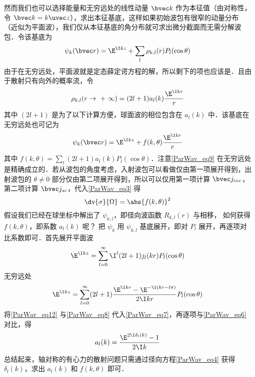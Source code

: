 然而我们也可以选择能量和无穷远处的线性动量 $\bvec k$ 作为本征值（由对称性，令 $\bvec k=k\uvec z$），求出本征基底，这样如果初始波包有很窄的动量分布（近似为平面波），我们仅从本征基底的角分布就可求出微分截面而无需分解波包．令该基底为
\begin{equation}\label{ParWav_eq7}
\psi_k(\bvec r) = \E^{\I kz} + \sum_l \rho_{k,l}(r) P_l(\cos \theta)
\end{equation}
由于在无穷远处，平面波就是定态薛定谔方程的解，所以剩下的项也应该是．且由于散射只有向外的概率流，令
\begin{equation}\label{ParWav_eq8}
{\rho_{k,l}}(r \to {\text{ + }}\infty ) = (2l + 1){a_l}(k)\frac{\E^{\I kr}}{r}
\end{equation}
其中 $(2l + 1)$ 是为了以下计算方便，球面波的相位包含在 ${a_l}(k)$ 中．该基底在无穷远处也可记为
\begin{equation}\label{ParWav_eq9}
\psi_k(\bvec r) = \E^{\I kz} + f(k,\theta )\frac{\E^{\I kr}}{r}
\end{equation}
其中 $f(k,\theta) = \sum_l (2l + 1) a_l(k) P_l(\cos \theta)$．注意\autoref{ParWav_eq9} 在无穷远处是精确成立的．若从波包的角度考虑，入射波包可以看做仅由第一项展开得到，出射波包的 $\theta  \ne 0$ 部分仅由第二项展开得到，所以可以仅用第一项计算 $\bvec j_{inc}$， 第二项计算 $\bvec j_{sc}$，代入\autoref{ParWav_eq3} 得
\begin{equation}
\dv{\sigma }{\Omega} = \abs{f(k,\theta)}^2
\end{equation}
假设我们已经在球坐标中解出了 $\psi_{k,l}$，即径向波函数 $R_{k,l}(r)$ 与相移， 如何获得 $f(k,\theta )$，即系数 $a_l(k)$ 呢？ 把 $\psi_k$ 用 $\psi_{k,l}$ 基底展开，即对 $P_l$ 展开，再逐项对比系数即可．首先展开平面波
\begin{equation}
\E^{\I kz} = \sum_{l = 0}^\infty  \I^l (2l + 1) j_l(kr) P_l(\cos \theta)
\end{equation}
无穷远处
\begin{equation}\label{ParWav_eq12}
\E^{\I kz} = \sum_{l=0}^\infty  (2l + 1)\frac{\E^{\I kr} - \E^{-\I(kr - l\pi)}}{2\I kr} P_l(\cos \theta)
\end{equation}
将\autoref{ParWav_eq12} 与\autoref{ParWav_eq8} 代入\autoref{ParWav_eq7}，再逐项与\autoref{ParWav_eq6} 对比，得
\begin{equation}
a_l(k) = \frac{\E^{2\I \delta_l(k)} - 1}{2\I k}
\end{equation}
总结起来，轴对称的有心力的散射问题只需通过径向方程\autoref{ParWav_eq4} 获得 $\delta_l (k)$，求出 $a_l(k)$ 和 $f(k, \theta)$ 即可．

